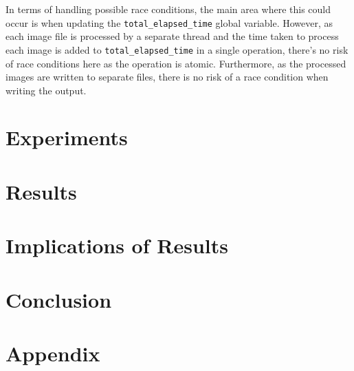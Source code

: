 \documentclass{article}
\begin{document}
In terms of handling possible race conditions,
the main area where this could occur is when updating the \texttt{total\_elapsed\_time}
global variable. However, as each image file is processed
by a separate thread and the time taken to process each image is
added to \texttt{total\_elapsed\_time} in a single operation, there's no risk of
race conditions here as the operation is atomic.
Furthermore, as the processed images are written to separate files,
there is no risk of a race condition when writing the output.\\

\section*{Experiments}

\section*{Results}

\section*{Implications of Results}

\section*{Conclusion}

\appendix
\section*{Appendix}
\end{document}
